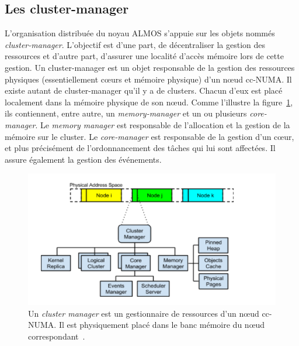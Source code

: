     
    \subsection{Les cluster-manager}

      L'organisation distribuée du noyau ALMOS s’appuie sur les objets nommés
      \textit{cluster-manager}. L’objectif est d’une part, de décentraliser la
      gestion des ressources et d’autre part, d’assurer une localité d’accès
      mémoire lors de cette gestion. Un cluster-manager est un objet responsable
      de la gestion des ressources physiques (essentiellement c\oe urs et
      mémoire physique) d’un n\oe ud cc-NUMA. Il existe autant de cluster-manager
      qu’il y a de clusters. Chacun d'eux est placé localement dans la mémoire
      physique de son n\oe ud. Comme l'illustre la
      figure~\ref{fig:cluster_manager}, ils contiennent, entre autre, un
      \textit{memory-manager} et un ou plusieurs \textit{core-manager}.  Le
      \textit{memory manager} est responsable de l'allocation et la gestion de
      la mémoire sur le cluster. Le \textit{core-manager} est responsable de la
      gestion d’un c\oe ur, et plus précisément de l'ordonnancement des tâches
      qui lui sont affectées. Il assure également la gestion des événements. %

      \begin{figure}[ht]
        \centering
        \includegraphics[scale=0.8]{include/img/cluster_manager}
        \caption{Un \textit{cluster manager} est un gestionnaire de ressources
          d'un n\oe ud cc-NUMA. Il est physiquement placé dans le banc mémoire
          du n\oe ud correspondant~\citep{almaless2014universite}.}
        \label{fig:cluster_manager}
      \end{figure}

